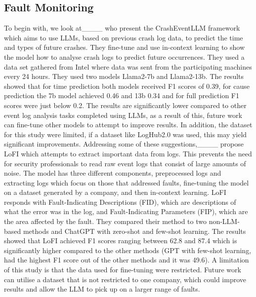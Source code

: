 \subsection{Fault Monitoring}
To begin with, we look at____ who present the CrashEventLLM framework which aims to use LLMs, based on previous crash log data, to predict the time and types of future crashes. They fine-tune and use in-context learning to show the model how to analyse crash logs to predict future occurrences. They used a data set gathered from Intel where data was sent from the participating machines every 24 hours. They used two models Llama2-7b and Llama2-13b. The results showed that for time prediction both models received F1 scores of 0.39, for cause prediction the 7b model achieved 0.46 and 13b 0.34 and for full prediction F1 scores were just below 0.2. The results are significantly lower compared to other event log analysis tasks completed using LLMs, as a result of this, future work can fine-tune other models to attempt to improve results. In addition, the dataset for this study were limited, if a dataset like LogHub2.0 was used, this may yield significant improvements. Addressing some of these suggestions,____ propose LoFI which attempts to extract important data from logs. This prevents the need for security professionals to read raw event logs that consist of large amounts of noise. The model has three different components, preprocessed logs and extracting logs which focus on those that addressed faults, fine-tuning the model on a dataset generated by a company, and then in-context learning. LoFI responds with Fault-Indicating Descriptions (FID), which are descriptions of what the error was in the log, and Fault-Indicating Parameters (FIP), which are the area affected by the fault. They compared their method to two non-LLM-based methods and ChatGPT with zero-shot and few-shot learning. The results showed that LoFI achieved F1 scores ranging between 62.8 and 87.4 which is significantly higher compared to the other methods (GPT with few-shot learning, had the highest F1 score out of the other methods and it was 49.6). A limitation of this study is that the data used for fine-tuning were restricted. Future work can utilise a dataset that is not restricted to one company, which could improve results and allow the LLM to pick up on a larger range of faults.

